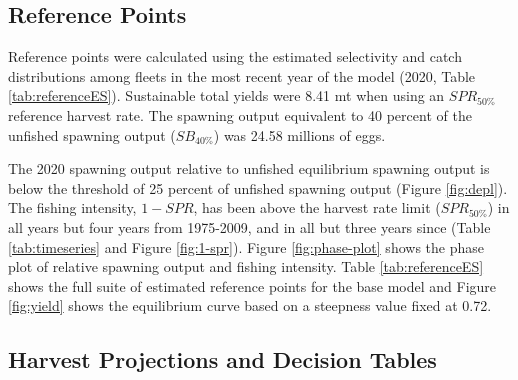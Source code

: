 \documentclass[11pt,
  english,
  a4paper,
]{article}
\begin{document}
\hypertarget{reference-points}{%
\subsection{Reference Points}\label{reference-points}}

\leavevmode\tagmcend\tagstructend


Reference points were calculated using the estimated selectivity and catch distributions among fleets in the most recent year of the model (2020, Table \ref{tab:referenceES}). Sustainable total yields were 8.41 mt when using an {\(SPR_{50\%}\)\leavevmode\tagmcend\tagstructend} reference harvest rate. The spawning output equivalent to 40 percent of the unfished spawning output ({\(SB_{40\%}\)\leavevmode\tagmcend\tagstructend}) was 24.58 millions of eggs.

\leavevmode\tagmcend\tagstructend\par


The 2020 spawning output relative to unfished equilibrium spawning output is below the threshold of 25 percent of unfished spawning output (Figure \ref{fig:depl}). The fishing intensity, {\(1-SPR\)\leavevmode\tagmcend\tagstructend}, has been above the harvest rate limit ({\(SPR_{50\%}\)\leavevmode\tagmcend\tagstructend}) in all years but four years from 1975-2009, and in all but three years since (Table \ref{tab:timeseries} and Figure \ref{fig:1-spr}). Figure \ref{fig:phase-plot} shows the phase plot of relative spawning output and fishing intensity. Table \ref{tab:referenceES} shows the full suite of estimated reference points for the base model and Figure \ref{fig:yield} shows the equilibrium curve based on a steepness value fixed at 0.72.

\leavevmode\tagmcend\tagstructend\par


\hypertarget{harvest-projections-and-decision-tables}{%
\subsection{Harvest Projections and Decision Tables}\label{harvest-projections-and-decision-tables}}
\end{document}
